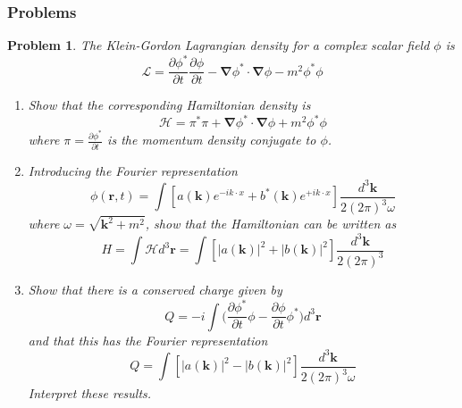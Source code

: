 \documentclass[a4paper]{article}
\theoremstyle{new}
\newtheorem{qns}{Problem}[section]
\begin{document}
\subsubsection{Problems}
\begin{qns}
The Klein-Gordon Lagrangian density for a complex scalar field $\phi$ is
$$\mathcal{L}=\frac{\partial\phi^*}{\partial t}\frac{\partial\phi}{\partial t}-\boldsymbol{\nabla}\phi^*\cdot\boldsymbol{\nabla}\phi-m^2\phi^*\phi$$
\begin{enumerate}[label=(\alph*)]
\item Show that the corresponding Hamiltonian density is
$$\mathcal{H}=\pi^*\pi+\boldsymbol{\nabla}\phi^*\cdot\boldsymbol{\nabla}\phi+m^2\phi^*\phi$$
where $\pi=\frac{\partial\phi^*}{\partial t}$ is the momentum density conjugate to $\phi$.
\item Introducing the Fourier representation
$$\phi(\mathbf{r},t)=\int[a(\mathbf{k})e^{-ik\cdot x}+b^*(\mathbf{k})e^{+ik\cdot x}]\frac{d^3\mathbf{k}}{2(2\pi)^3\omega}$$
where $\omega=\sqrt{\mathbf{k}^2+m^2}$, show that the Hamiltonian can be written as
$$H=\int\mathcal{H}d^3\mathbf{r}=\int[|a(\mathbf{k})|^2+|b(\mathbf{k})|^2]\frac{d^3\mathbf{k}}{2(2\pi)^3}$$
\item Show that there is a conserved charge given by
$$Q=-i\int\bigg(\frac{\partial\phi^*}{\partial t}\phi-\frac{\partial\phi}{\partial t}\phi^*\bigg)d^3\mathbf{r}$$
and that this has the Fourier representation 
$$Q=\int[|a(\mathbf{k})|^2-|b(\mathbf{k})|^2]\frac{d^3\mathbf{k}}{2(2\pi)^3\omega}$$
Interpret these results.
\end{enumerate}
\end{qns}
\end{document}
